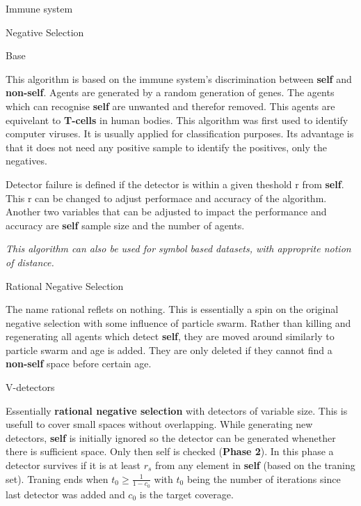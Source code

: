 \documentclass[12pt, letterpaper]{article}
\begin{document}
\begin{section}{Immune system}

  \begin{subsection}{Negative Selection}

  \begin{subsubsection}{Base}

    This algorithm is based on the immune system's discrimination between
    \textbf{self} and \textbf{non-self}. Agents are generated by a random
    generation of genes. The agents which can recognise \textbf{self} are
    unwanted and therefor removed. This agents are equivelant to
    \textbf{T-cells} in human bodies.
    This algorithm was first used to identify computer viruses. It is usually
    applied for classification purposes. Its advantage is that it does not need
    any positive sample to identify the positives, only the negatives.

    Detector failure is defined if the detector is within a given theshold r
    from \textbf{self}. This r can be changed to adjust performace and accuracy
    of the algorithm. Another two variables that can be adjusted to impact the
    performance and accuracy are \textbf{self} sample size and the number of
    agents.

    \textit{This algorithm can also be used for symbol based datasets, with
    approprite notion of distance.}

  \end{subsubsection}

  \begin{subsubsection}{Rational Negative Selection}

    The name rational reflets on nothing. This is essentially a spin on the
    original negative selection with some influence of particle swarm. Rather
    than killing and regenerating all agents which detect \textbf{self}, they
    are moved around similarly to particle swarm and age is added. They are
    only deleted if they cannot find a \textbf{non-self} space before certain
    age.

  \end{subsubsection}

  \begin{subsubsection}{V-detectors}

    Essentially \textbf{rational negative selection} with detectors of variable
    size. This is usefull to cover small spaces without overlapping. While
    generating new detectors, \textbf{self} is initially ignored so the detector
    can be generated whenether there is sufficient space. Only then self is
    checked (\textbf{Phase 2}). In this phase a detector survives if it is at
    least \(r_{s}\) from any element in \textbf{self} (based on the traning set).
    Traning ends when \(t_{0} \geq \frac{1}{1 - c_{0}}\) with \(t_{0}\) being
    the number of iterations since last detector was added and \(c_{0}\) is
    the target coverage.

  \end{subsubsection}

  \end{subsection}

\end{section}
\end{document}
